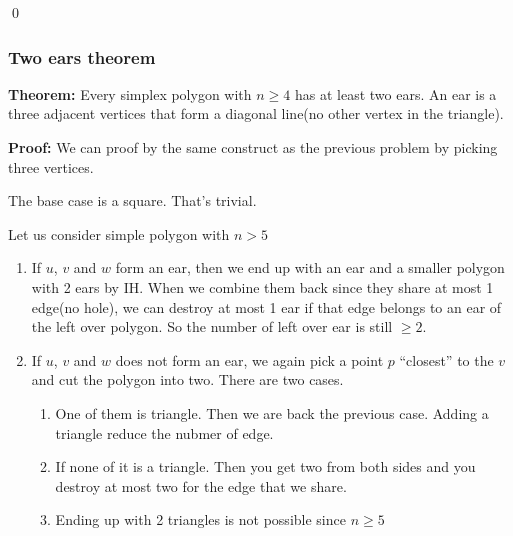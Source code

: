 \documentclass[a4paper, 12pt]{article}
\newcommand{\theorem}{\vspace{1em}\noindent\textbf{Theorem:} }
\renewcommand{\proof}{\vspace{0.5em}\noindent\textbf{Proof:} }
\newcommand{\qedd}{\qed\newline}
\begin{document}
\begin{enumerate}
\begin{center}
			\end{center} 
	\end{enumerate}
	\qedd
	

	\subsubsection*{Two ears theorem}
	\theorem Every simplex polygon with $n\ge 4$ has at least two ears. An ear is a three adjacent vertices that form a diagonal line(no other vertex in the triangle).
	
	\proof We can proof by the same construct as the previous problem by picking three vertices.
	
	The base case is a square. That's trivial.
	
	Let us consider simple polygon with $n>5$
	
	\begin{enumerate}
		\item If $u$, $v$ and $w$ form an ear, then we end up with an ear and a smaller polygon with 2 ears by IH. When we combine them back since they share at most 1 edge(no hole), we can destroy at most 1 ear if that edge belongs to an ear of the left over polygon. So the number of left over ear is still $\ge 2$.
		
		\item If $u$, $v$ and $w$ does not form an ear, we again pick a point $p$ ``closest'' to the $v$ and cut the polygon into two. There are two cases.
		\begin{enumerate}
			\item One of them is triangle. Then we are back the previous case. Adding a triangle reduce the nubmer of edge. 
			\item If none of it is a triangle. Then you get two from both sides and you destroy at most two for the edge that we share.
			\item Ending up with 2 triangles is not possible since $n\ge 5$ 
		\end{enumerate}
	\end{enumerate}
	
\end{document}
